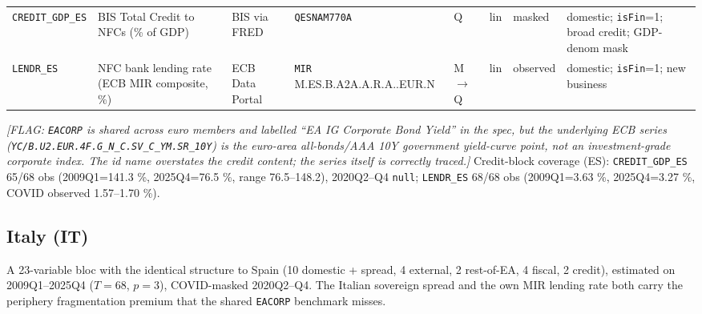 \begin{longtable}{@{}p{}p{}p{}p{}p{}p{}p{}p{}@{}}
\texttt{CREDIT\_GDP\_ES} & BIS Total Credit to NFCs (\% of GDP) & BIS via FRED & \texttt{QESNAM770A} & Q & lin & masked & domestic; \texttt{isFin}=1; broad credit; GDP-denom mask \\
\texttt{LENDR\_ES} & NFC bank lending rate (ECB MIR composite, \%) & ECB Data Portal & \texttt{MIR} M.\allowbreak ES.\allowbreak B.\allowbreak A2A.\allowbreak A.\allowbreak R.\allowbreak A.\allowbreak 2240.\allowbreak EUR.\allowbreak N & M$\to$Q & lin & observed & domestic; \texttt{isFin}=1; new business \\
\end{longtable}

\noindent\textit{[FLAG: \texttt{EACORP} is shared across euro members and labelled
``EA IG Corporate Bond Yield'' in the spec, but the underlying ECB series
(\texttt{YC/B.\allowbreak U2.\allowbreak EUR.4F.\allowbreak G\_N\_C.\allowbreak SV\_C\_YM.\allowbreak SR\_10Y}) is the euro-area
all-bonds/AAA 10Y \emph{government} yield-curve point, not an investment-grade
corporate index. The id name overstates the credit content; the series itself is
correctly traced.]}
Credit-block coverage (ES): \texttt{CREDIT\_GDP\_ES} 65/68 obs (2009Q1=141.3 \%,
2025Q4=76.5 \%, range 76.5--148.2), 2020Q2--Q4 \texttt{null}; \texttt{LENDR\_ES}
68/68 obs (2009Q1=3.63 \%, 2025Q4=3.27 \%, COVID observed 1.57--1.70 \%).

\subsection{Italy (IT)}\label{sec:data:IT}

A 23-variable bloc with the identical structure to Spain (10 domestic + spread,
4 external, 2 rest-of-EA, 4 fiscal, 2 credit), estimated on 2009Q1--2025Q4
($T=68$, $p=3$), COVID-masked 2020Q2--Q4. The Italian sovereign spread and the
own MIR lending rate both carry the periphery fragmentation premium that the
shared \texttt{EACORP} benchmark misses.

